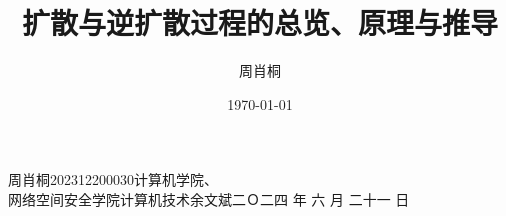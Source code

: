 \documentclass[a4paper]{nuist}
\title{扩散与逆扩散过程的总览、原理与推导}
\author{
    周肖桐 \\
}
\date{\today}
\begin{document}
{周肖桐}{202312200030}{计算机学院、\\网络空间安全学院}{计算机技术}{余文斌}{二Ｏ二四\hspace{0.4em} 年\hspace{0.4em} 六\hspace{0.4em} 月\hspace{0.4em} 二十一\hspace{0.4em} 日}

\tableofcontents
\newpage








    
\end{document}
